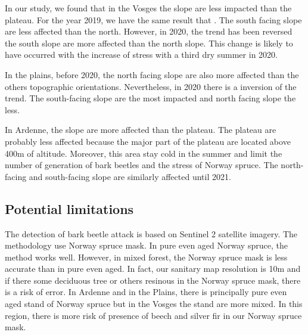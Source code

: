 \documentclass[3p,procedia]{elsarticle}
\begin{document}
In our study, we found that in the Vosges the slope are less impacted than the plateau. 
For the year 2019, we have the same result that \cite{nardi_drought_2022}. 
The south facing slope are less affected than the north. 
However, in 2020, the trend has been reversed the south slope are more affected than the north slope. 
This change is likely to have occurred with the increase of stress with a third dry summer in 2020.

In the plains, before 2020, the north facing slope are also more affected than the others topographic orientations. 
Nevertheless, in 2020 there is a inversion of the trend. 
The south-facing slope are the most impacted and north facing slope the less.

In Ardenne, the slope are more affected than the plateau. The plateau are probably less affected because the major part of the plateau are located above 400m of altitude.
Moreover, this area stay cold in the summer and limit the number of generation of bark beetles and the stress of Norway spruce.
The north-facing and south-facing slope are similarly affected until 2021. 


 

\subsection{Potential limitations}
The detection of bark beetle attack is based on Sentinel 2 satellite imagery.
The methodology use Norway spruce mask. 
In pure even aged Norway spruce, the method works well. 
However, in mixed forest, the Norway spruce mask is less accurate than in pure even aged.
In fact, our sanitary map resolution is 10m and if there some deciduous tree or others resinous in the Norway spruce mask, there is a risk of error.
In Ardenne and in the Plains, there is principally pure even aged stand of Norway spruce but in the Vosges the stand are more mixed.
In this region, there is more risk of presence of beech and silver fir in our Norway spruce mask.
\end{document}
